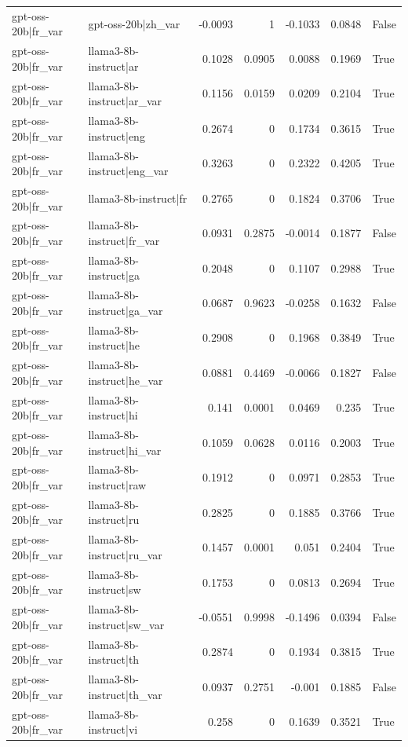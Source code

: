 \begin{table}
\begin{tabular}{l l r r r r l}
gpt-oss-20b|fr_var & gpt-oss-20b|zh_var & -0.0093 & 1 & -0.1033 & 0.0848 & False \\
gpt-oss-20b|fr_var & llama3-8b-instruct|ar & 0.1028 & 0.0905 & 0.0088 & 0.1969 & True \\
gpt-oss-20b|fr_var & llama3-8b-instruct|ar_var & 0.1156 & 0.0159 & 0.0209 & 0.2104 & True \\
gpt-oss-20b|fr_var & llama3-8b-instruct|eng & 0.2674 & 0 & 0.1734 & 0.3615 & True \\
gpt-oss-20b|fr_var & llama3-8b-instruct|eng_var & 0.3263 & 0 & 0.2322 & 0.4205 & True \\
gpt-oss-20b|fr_var & llama3-8b-instruct|fr & 0.2765 & 0 & 0.1824 & 0.3706 & True \\
gpt-oss-20b|fr_var & llama3-8b-instruct|fr_var & 0.0931 & 0.2875 & -0.0014 & 0.1877 & False \\
gpt-oss-20b|fr_var & llama3-8b-instruct|ga & 0.2048 & 0 & 0.1107 & 0.2988 & True \\
gpt-oss-20b|fr_var & llama3-8b-instruct|ga_var & 0.0687 & 0.9623 & -0.0258 & 0.1632 & False \\
gpt-oss-20b|fr_var & llama3-8b-instruct|he & 0.2908 & 0 & 0.1968 & 0.3849 & True \\
gpt-oss-20b|fr_var & llama3-8b-instruct|he_var & 0.0881 & 0.4469 & -0.0066 & 0.1827 & False \\
gpt-oss-20b|fr_var & llama3-8b-instruct|hi & 0.141 & 0.0001 & 0.0469 & 0.235 & True \\
gpt-oss-20b|fr_var & llama3-8b-instruct|hi_var & 0.1059 & 0.0628 & 0.0116 & 0.2003 & True \\
gpt-oss-20b|fr_var & llama3-8b-instruct|raw & 0.1912 & 0 & 0.0971 & 0.2853 & True \\
gpt-oss-20b|fr_var & llama3-8b-instruct|ru & 0.2825 & 0 & 0.1885 & 0.3766 & True \\
gpt-oss-20b|fr_var & llama3-8b-instruct|ru_var & 0.1457 & 0.0001 & 0.051 & 0.2404 & True \\
gpt-oss-20b|fr_var & llama3-8b-instruct|sw & 0.1753 & 0 & 0.0813 & 0.2694 & True \\
gpt-oss-20b|fr_var & llama3-8b-instruct|sw_var & -0.0551 & 0.9998 & -0.1496 & 0.0394 & False \\
gpt-oss-20b|fr_var & llama3-8b-instruct|th & 0.2874 & 0 & 0.1934 & 0.3815 & True \\
gpt-oss-20b|fr_var & llama3-8b-instruct|th_var & 0.0937 & 0.2751 & -0.001 & 0.1885 & False \\
gpt-oss-20b|fr_var & llama3-8b-instruct|vi & 0.258 & 0 & 0.1639 & 0.3521 & True \\

\end{tabular}
\end{table}
